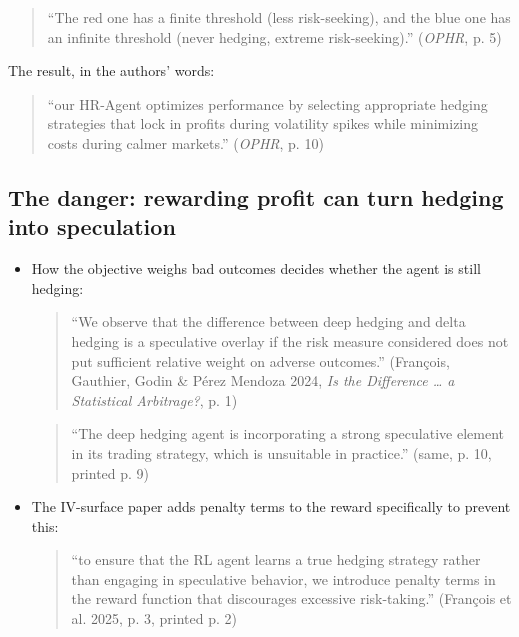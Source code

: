 \documentclass{article}
\begin{document}
\begin{itemize}
\begin{quote}``The red one has a finite threshold (less risk-seeking), and the blue one has an infinite threshold (never hedging, extreme risk-seeking).'' (\emph{OPHR}, p. 5)\end{quote}

The result, in the authors' words:

\begin{quote}``our HR-Agent optimizes performance by selecting appropriate hedging strategies that lock in profits during volatility spikes while minimizing costs during calmer markets.'' (\emph{OPHR}, p. 10)\end{quote}

\end{itemize}

\subsection{The danger: rewarding profit can turn hedging into speculation}

\begin{itemize}

\item How the objective weighs bad outcomes decides whether the agent is still hedging:

\begin{quote}``We observe that the difference between deep hedging and delta hedging is a speculative overlay if the risk measure considered does not put sufficient relative weight on adverse outcomes.'' (François, Gauthier, Godin \& Pérez Mendoza 2024, \emph{Is the Difference \ldots{} a Statistical Arbitrage?}, p. 1)\end{quote}

\begin{quote}``The deep hedging agent is incorporating a strong speculative element in its trading strategy, which is unsuitable in practice.'' (same, p. 10, printed p. 9)\end{quote}

\item The IV-surface paper adds penalty terms to the reward specifically to prevent this:

\begin{quote}``to ensure that the RL agent learns a true hedging strategy rather than engaging in speculative behavior, we introduce penalty terms in the reward function that discourages excessive risk-taking.'' (François et al. 2025, p. 3, printed p. 2)\end{quote}

\end{itemize}
\end{document}
